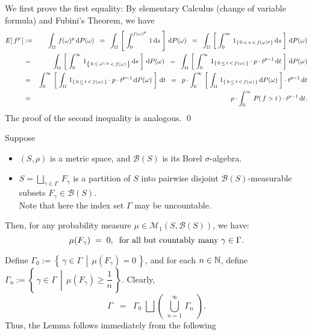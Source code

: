 \proof
\vskip 0.1cm
\noindent
We first prove the first equality:
By elementary Calculus (change of variable formula) and Fubini's Theorem, we have
\begin{eqnarray*}
E\!\left[\,f^{p}\,\right]
&:=& \int_{\Omega}\,f(\omega)^{p}\,\textnormal{d} P(\omega)
\;\;=\;\; \int_{\Omega}\,\left[\;\int_{0}^{f(\omega)^{p}}\,1\,\textnormal{d} s\;\right]\,\textnormal{d} P(\omega)
\;\;=\;\; \int_{\Omega}\,\left[\;\int_{0}^{\infty}\,1_{\left\{\,0\,<\,s\,<\,f(\omega)^{p}\right\}}\,\textnormal{d} s\;\right]\,\textnormal{d} P(\omega)
\\
&=& \int_{\Omega}\,\left[\;\int_{0}^{\infty}\,1_{\left\{\,0 \,\leq\, s^{1/p} \,<\, f(\omega)\,\right\}}\,\textnormal{d} s\;\right]\,\textnormal{d} P(\omega)
\;\;=\;\; \int_{\Omega}\,\left[\;\int_{0}^{\infty}\,1_{\left\{\,0 \,\leq\, t \,<\, f(\omega)\,\right\}}\cdot p \cdot t^{p-1} \,\textnormal{d} t\;\right]\,\textnormal{d} P(\omega)
\\
&=& \int_{0}^{\infty}\,\left[\;\int_{\Omega}\,1_{\left\{\,0 \,\leq\, t \,<\, f(\omega)\,\right\}}\cdot p \cdot t^{p-1} \,\textnormal{d} P(\omega)\;\right]\,\textnormal{d} t
\;\;=\;\; p \cdot \int_{0}^{\infty}\,\left[\;\int_{\Omega}\,1_{\left\{\,0 \,\leq\, t \,<\, f(\omega)\,\right\}}\,\textnormal{d} P(\omega)\;\right] \cdot t^{p-1} \,\textnormal{d} t
\\
&=& p \cdot \int_{0}^{\infty}\, P\!\left(\,f > t\,\right)\cdot t^{p-1} \,\textnormal{d} t.
\end{eqnarray*}
The proof of the second inequality is analogous.
\qed

\begin{lemma}
\label{LemmaUncountablePartition}
\mbox{}
\vskip 0.1cm
\noindent
Suppose
\begin{itemize}
\item	$\left(S,\rho\right)$ is a metric space, and $\mathcal{B}(S)$ is its Borel $\sigma$-algebra.
\item	$S = \underset{\gamma\in\Gamma}{\bigsqcup}\,F_{\gamma}$ is a partition of $S$ into
		pairwise disjoint $\mathcal{B}(S)$-measurable subsets $F_{\gamma} \in \mathcal{B}(S)$.\\
		Note that here the index set $\Gamma$ may be uncountable.
\end{itemize}
Then, for any probability measure $\mu \in \mathcal{M}_{1}\!\left(S,\mathcal{B}(S)\right)$, we have:
\begin{equation*}
\mu\!\left(F_{\gamma}\right) \; = \; 0,
\;\;\textnormal{for all but countably many $\gamma \in \Gamma$}.
\end{equation*}
\end{lemma}
\proof
Define
$\Gamma_{0} := \left\{\,\gamma\in\Gamma\;\,\left\vert\;\,\mu(F_{\gamma}) = 0\right.\,\right\}$,
and for each $n \in \mathbb{N}$, define
$\Gamma_{n} := \left\{\,\gamma\in\Gamma\;\,\left\vert\;\,\mu(F_{\gamma}) \geq \dfrac{1}{n}\right.\,\right\}$.
Clearly,
\begin{equation*}
\Gamma \;\; = \;\; \Gamma_{0}\;\bigsqcup\left(\;\bigcup_{n=1}^{\infty}\,\Gamma_{n}\;\right).
\end{equation*}
Thus, the Lemma follows immediately from the following

